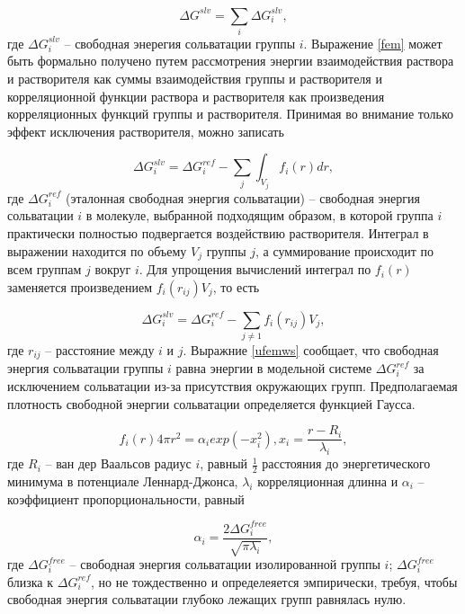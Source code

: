 \begin{equation}
	\Delta G^{slv} = \sum_i \Delta G_i^{slv},
	\label{fem}
\end{equation}
где $\Delta G_i^{slv}$ -- свободная энерегия сольватации группы $i$. Выражение \ref{fem} может быть формально получено путем рассмотрения энергии взаимодействия раствора и растворителя как суммы взаимодействия группы и растворителя и корреляционной функции раствора и растворителя как произведения корреляционных функций группы и растворителя. Принимая во внимание только эффект исключения растворителя, можно записать 

\begin{equation}
	\Delta G_i^{slv} = \Delta G_i^{ref} - \sum_j \int_{V_j} f_i(r) dr,
	\label{femws}
\end{equation}
где $\Delta G_i^{ref}$ (эталонная свободная энергия сольватации) -- свободная энергия сольватации $i$ в молекуле, выбранной подходящим образом, в которой группа $i$ практически полностью подвергается воздействию растворителя. Интеграл в выражении находится по объему $V_j$ группы $j$, а суммирование происходит по всем группам $j$ вокруг $i$. Для упрощения вычислений интеграл по $f_i(r)$ заменяется произведением $f_i(r_{ij})V_j$, то есть

\begin{equation}
	\Delta G_i^{slv} = \Delta G_i^{ref} - \sum_{j \neq 1} f_i(r_{ij}) V_j,
	\label{ufemws}
\end{equation}
где $r_{ij}$ -- расстояние между $i$ и $j$. Выражние \ref{ufemws} сообщает, что свободная энергия сольватации группы $i$ равна энергии в модельной системе $\Delta G_i^{ref}$ за исключением сольватации из-за присутствия окружающих групп. Предполагаемая плотность свободной энергии сольватации определяется функцией Гаусса.

\begin{equation}
	f_i(r) 4 \pi r^2 = \alpha_i exp(-x_i^2), x_i = \frac{r - R_i}{\lambda_i},
	\label{gf}
\end{equation}
где $R_i$ -- ван дер Ваальсов радиус $i$, равный $\frac{1}{2}$ расстояния до энергетического минимума в потенциале Леннард-Джонса, $\lambda_i$ корреляционная длинна и $\alpha_i$ -- коэффициент пропорциональности, равный

\begin{equation}
	\alpha_i = \frac{2 \Delta G_i^{free}}{\sqrt{\pi \lambda_i}},
	\label{kpr}
\end{equation}
где $\Delta G_i^{free}$ -- свободная энергия сольватации изолированной группы $i$; $\Delta G_i^{free}$ близка к $\Delta G_i^{ref}$, но не тождественно и определеяется эмпирически, требуя, чтобы свободная энергия сольватации глубоко лежащих групп равнялась нулю.


